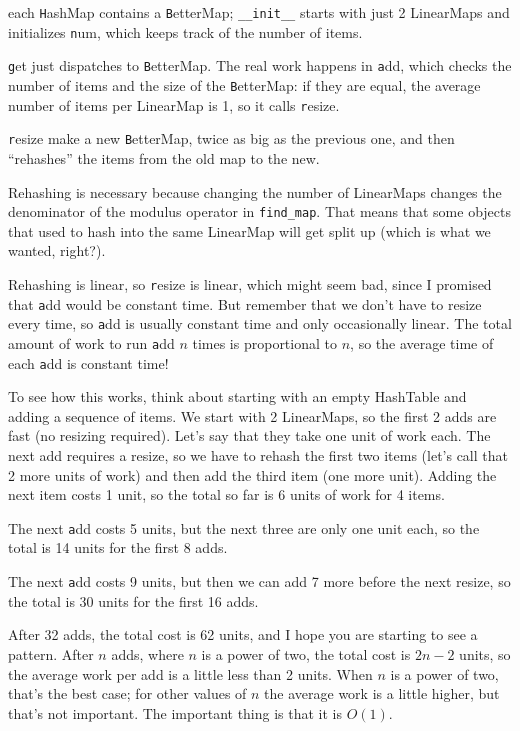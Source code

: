 \documentclass[
DIV=11,
fontsize=13,
twoside,
headinclude=false,
titlepage=firstiscover,
abstract=true,
headsepline=true,
footsepline=true,
chapterprefix=true, %
headings=big,
bibliography=totoc,%
captions=tableheading
]{scrbook}
\theoremstyle{definition}
\begin{document}
each {\texttt HashMap} contains a {\texttt BetterMap}; \verb"__init__" starts
with just 2 LinearMaps and initializes {\texttt num}, which keeps track of
the number of items.

{\texttt get} just dispatches to {\texttt BetterMap}.  The real work happens
in {\texttt add}, which checks the number of items and the size of the
{\texttt BetterMap}: if they are equal, the average number of items per
LinearMap is 1, so it calls {\texttt resize}.

{\texttt resize} make a new {\texttt BetterMap}, twice as big as the previous
one, and then ``rehashes'' the items from the old map to the new.

Rehashing is necessary because changing the number of LinearMaps
changes the denominator of the modulus operator in
\verb"find_map".  That means that some objects that used
to hash into the same LinearMap will get split up (which is
what we wanted, right?).

Rehashing is linear, so
{\texttt resize} is linear, which might seem bad, since I promised
that {\texttt add} would be constant time.  But remember that
we don't have to resize every time, so {\texttt add} is usually
constant time and only occasionally linear.  The total amount
of work to run {\texttt add} $n$ times is proportional to $n$,
so the average time of each {\texttt add} is constant time!

To see how this works, think about starting with an empty
HashTable and adding a sequence of items.  We start with 2 LinearMaps,
so the first 2 adds are fast (no resizing required).  Let's
say that they take one unit of work each.  The next add
requires a resize, so we have to rehash the first two
items (let's call that 2 more units of work) and then
add the third item (one more unit).  Adding the next item
costs 1 unit, so the total so far is
6 units of work for 4 items.

The next {\texttt add} costs 5 units, but the next three
are only one unit each, so the total is 14 units for the
first 8 adds.

The next {\texttt add} costs 9 units, but then we can add 7 more
before the next resize, so the total is 30 units for the
first 16 adds.

After 32 adds, the total cost is 62 units, and I hope you are starting
to see a pattern.  After $n$ adds, where $n$ is a power of two, the
total cost is $2n-2$ units, so the average work per add is
a little less than 2 units.  When $n$ is a power of two, that's
the best case; for other values of $n$ the average work is a little
higher, but that's not important.  The important thing is that it
is $O(1)$.
\end{document}
